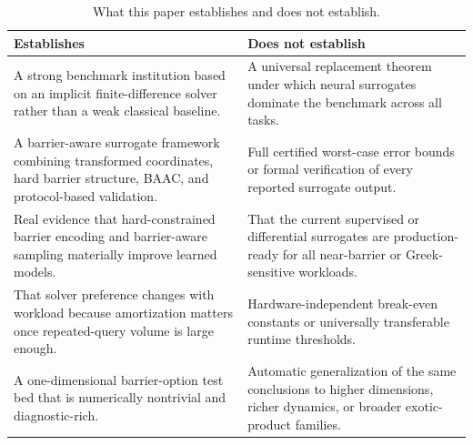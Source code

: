 \begin{table}
\caption{What this paper establishes and does not establish.}
\label{tab:establishes_vs_not_establishes}
\begin{tabular}{ll}
\toprule
Establishes & Does not establish \\
\midrule
A strong benchmark institution based on an implicit finite-difference solver rather than a weak classical baseline. & A universal replacement theorem under which neural surrogates dominate the benchmark across all tasks. \\
A barrier-aware surrogate framework combining transformed coordinates, hard barrier structure, BAAC, and protocol-based validation. & Full certified worst-case error bounds or formal verification of every reported surrogate output. \\
Real evidence that hard-constrained barrier encoding and barrier-aware sampling materially improve learned models. & That the current supervised or differential surrogates are production-ready for all near-barrier or Greek-sensitive workloads. \\
That solver preference changes with workload because amortization matters once repeated-query volume is large enough. & Hardware-independent break-even constants or universally transferable runtime thresholds. \\
A one-dimensional barrier-option test bed that is numerically nontrivial and diagnostic-rich. & Automatic generalization of the same conclusions to higher dimensions, richer dynamics, or broader exotic-product families. \\
\bottomrule
\end{tabular}
\end{table}
